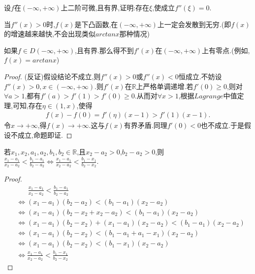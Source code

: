 \documentclass[lang=cn,newtx,10pt,scheme=chinese]{../Template/elegantbook}
\begin{document}
\begin{proposition}\label{pro:二阶导数零点的存在性}
    设\(f\)在\((-\infty,+\infty)\)上二阶可微,且有界,证明:存在\(\xi\),使成立\(f''(\xi)=0\).
\end{proposition}
\begin{note}
    当$f''(x)>0$时,$f(x)$是下凸函数,在$(-\infty,+\infty)$上一定会发散到无穷.(即$f(x)$的增速越来越快,不会出现类似$arctanx$那种情况)
\end{note}
\begin{remark}
    如果$f\in D(-\infty,+\infty)$,且有界.那么得不到$f'(x)$在$(-\infty,+\infty)$上有零点.(例如,$f(x)=arctanx$)
\end{remark}
\begin{proof}
    (反证)假设结论不成立,则$f''(x)>0$或$f''(x)<0$恒成立.不妨设$f''(x)>0,x\in (-\infty,+\infty)$.则$f'(x)$在$\mathbb{R}$上严格单调递增.若$f'(0)\ge0$,则对$\forall a>1$,都有$f'(a)>f'(1)>f'(0)\ge0$.从而对$\forall x>1$,根据$Lagrange$中值定理,可知,存在$\eta \in (1,x)$,使得
    \begin{align*}
        f(x)-f(0)=f'(\eta)(x-1)>f'(1)(x-1).
    \end{align*}
    令$x\to +\infty$,得$f(x)\to +\infty$.这与$f(x)$有界矛盾.同理$f'(0)<0$也不成立.于是假设不成立,命题即证.

\end{proof}

\begin{proposition}\label{pro:分式不等式等价变形}
    若\(x_1,x_2,a_1,a_2,b_1,b_2\in \mathbb{R}\),且\(x_2 - a_2 > 0\),\(b_2 - a_2 > 0\),则\(\frac{x_1 - a_1}{x_2 - a_2} < \frac{b_1 - a_1}{b_2 - a_2} \Leftrightarrow \frac{x_1 - a_1}{x_2 - a_2} < \frac{b_1 - x_1}{b_2 - x_2}\).
\end{proposition}
\begin{proof}
    \begin{align*}
        &\,\,\,\,\,\,\,\,\,\,\frac{x_1-a_1}{x_2-a_2}<\frac{b_1-a_1}{b_2-a_2}
        \\
        &\Leftrightarrow \left( x_1-a_1 \right) \left( b_2-a_2 \right) <\left( b_1-a_1 \right) \left( x_2-a_2 \right) 
\\
&\Leftrightarrow \left( x_1-a_1 \right) \left( b_2-x_2+x_2-a_2 \right) <\left( b_1-a_1 \right) \left( x_2-a_2 \right) 
\\
&\Leftrightarrow \left( x_1-a_1 \right) \left( b_2-x_2 \right) +\left( x_1-a_1 \right) \left( x_2-a_2 \right) <\left( b_1-a_1 \right) \left( x_2-a_2 \right) 
\\
&\Leftrightarrow \left( x_1-a_1 \right) \left( b_2-x_2 \right) <\left( b_1-a_1+a_1-x_1 \right) \left( x_2-a_2 \right) 
\\
&\Leftrightarrow \left( x_1-a_1 \right) \left( b_2-x_2 \right) <\left( b_1-x_1 \right) \left( x_2-a_2 \right) 
\\
&\Leftrightarrow \frac{x_1-a_1}{x_2-a_2}<\frac{b_1-x_1}{b_2-x_2}
    \end{align*}

\end{proof}
\end{document}
